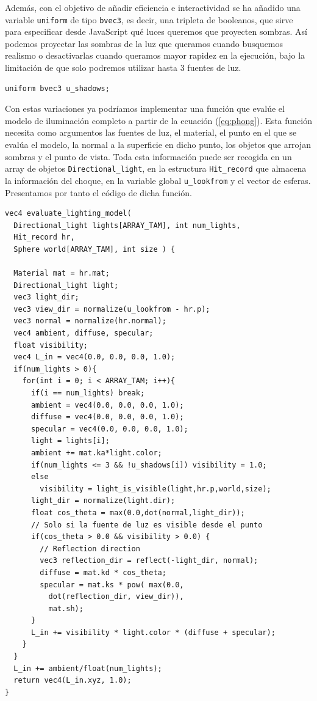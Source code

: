 Además, con el objetivo de añadir eficiencia e interactividad se ha añadido una variable \verb|uniform| de tipo \verb|bvec3|, es decir, una tripleta de booleanos, que sirve para especificar desde JavaScript qué luces queremos que proyecten sombras. Así podemos proyectar las sombras de la luz que queramos cuando busquemos realismo o desactivarlas cuando queramos mayor rapidez en la ejecución, bajo la limitación de que solo podremos utilizar hasta 3 fuentes de luz.

\begin{lstlisting}
uniform bvec3 u_shadows;
\end{lstlisting}

Con estas variaciones ya podríamos implementar una función que evalúe el modelo de iluminación completo a partir de la ecuación (\ref{eq:phong}). Esta función necesita como argumentos las fuentes de luz, el material, el punto en el que se evalúa el modelo, la normal a la superficie en dicho punto, los objetos que arrojan sombras y el punto de vista. Toda esta información puede ser recogida en un array de objetos \verb|Directional_light|, en la estructura \verb|Hit_record| que almacena la información del choque, en la variable global \verb|u_lookfrom| y el vector de esferas. Presentamos por tanto el código de dicha función.

\begin{lstlisting}
vec4 evaluate_lighting_model( 
  Directional_light lights[ARRAY_TAM], int num_lights, 
  Hit_record hr,
  Sphere world[ARRAY_TAM], int size ) {
  
  Material mat = hr.mat;
  Directional_light light;
  vec3 light_dir;
  vec3 view_dir = normalize(u_lookfrom - hr.p);
  vec3 normal = normalize(hr.normal);
  vec4 ambient, diffuse, specular;
  float visibility;
  vec4 L_in = vec4(0.0, 0.0, 0.0, 1.0);
  if(num_lights > 0){
    for(int i = 0; i < ARRAY_TAM; i++){
      if(i == num_lights) break;
      ambient = vec4(0.0, 0.0, 0.0, 1.0);
      diffuse = vec4(0.0, 0.0, 0.0, 1.0);
      specular = vec4(0.0, 0.0, 0.0, 1.0);
      light = lights[i];
      ambient += mat.ka*light.color;
      if(num_lights <= 3 && !u_shadows[i]) visibility = 1.0;
      else 
        visibility = light_is_visible(light,hr.p,world,size);
      light_dir = normalize(light.dir);
      float cos_theta = max(0.0,dot(normal,light_dir));
      // Solo si la fuente de luz es visible desde el punto
      if(cos_theta > 0.0 && visibility > 0.0) {
        // Reflection direction
        vec3 reflection_dir = reflect(-light_dir, normal);
        diffuse = mat.kd * cos_theta;
        specular = mat.ks * pow( max(0.0, 
          dot(reflection_dir, view_dir)), 
          mat.sh);
      }
      L_in += visibility * light.color * (diffuse + specular);
    }
  }
  L_in += ambient/float(num_lights);
  return vec4(L_in.xyz, 1.0);
}
\end{lstlisting}

